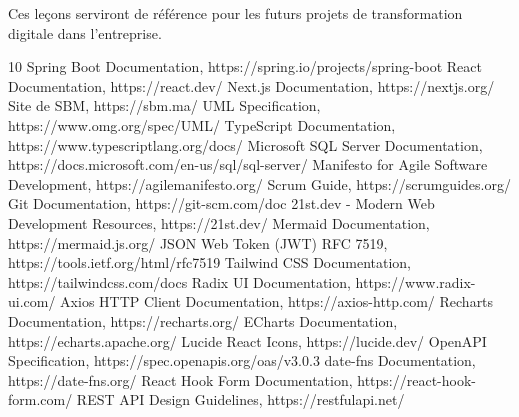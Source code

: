 \documentclass[12pt,a4paper]{report}
\begin{document}
Ces leçons serviront de référence pour les futurs projets de transformation digitale dans l'entreprise.
\lipsum[152-160]

\begin{thebibliography}{10}
 Spring Boot Documentation, https://spring.io/projects/spring-boot
 React Documentation, https://react.dev/
 Next.js Documentation, https://nextjs.org/
 Site de SBM, https://sbm.ma/
 UML Specification, https://www.omg.org/spec/UML/
 TypeScript Documentation, https://www.typescriptlang.org/docs/
 Microsoft SQL Server Documentation, https://docs.microsoft.com/en-us/sql/sql-server/
 Manifesto for Agile Software Development, https://agilemanifesto.org/
 Scrum Guide, https://scrumguides.org/
 Git Documentation, https://git-scm.com/doc
 21st.dev - Modern Web Development Resources, https://21st.dev/
 Mermaid Documentation, https://mermaid.js.org/
 JSON Web Token (JWT) RFC 7519, https://tools.ietf.org/html/rfc7519
 Tailwind CSS Documentation, https://tailwindcss.com/docs
 Radix UI Documentation, https://www.radix-ui.com/
 Axios HTTP Client Documentation, https://axios-http.com/
 Recharts Documentation, https://recharts.org/
 ECharts Documentation, https://echarts.apache.org/
 Lucide React Icons, https://lucide.dev/
 OpenAPI Specification, https://spec.openapis.org/oas/v3.0.3
 date-fns Documentation, https://date-fns.org/
 React Hook Form Documentation, https://react-hook-form.com/
 REST API Design Guidelines, https://restfulapi.net/
\end{thebibliography}
\end{document}
